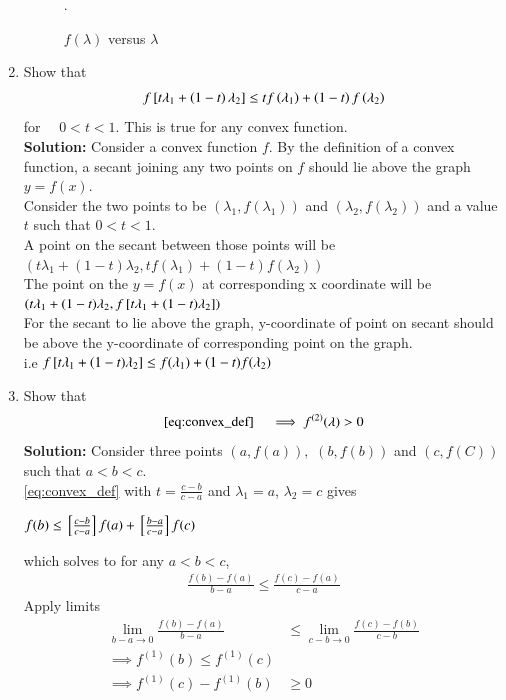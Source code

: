 \begin{enumerate}[label=\arabic*.,ref=\thesection.\theenumi]
\begin{figure}[!ht]
\caption{ $f(\lambda)$ versus $\lambda$}.
\label{fig:conv_def}	
\end{figure}
%
\item Show that
%
\begin{align}
\label{eq:convex_def}
f{}\left[t \lambda_1 + \left(1-t\right)\lambda_2\right] \leq 
t f\left(\lambda_1\right) + \left(1-t\right)f\left(\lambda_2\right)
\end{align}
%
for $\quad 0 < t < 1$.  This is true for any convex function.\\
%
\textbf{Solution: } Consider a convex function $f$. By the definition of a convex function, a secant joining any two points on $f$ should lie above the graph $y=f(x)$.\\
Consider the two points to be $(\lambda_1,f(\lambda_1))$ and $(\lambda_2,f(\lambda_2))$ and a value $t$ such that $0 < t < 1$.\\
A point on the secant between those points will be \\ 
$(t\lambda_1+(1-t)\lambda_2,t f(\lambda_1)+(1-t)f(\lambda_2))$ \\
The point on the $y=f(x)$ at corresponding x coordinate will be\\ 
$(t\lambda_1+(1-t)\lambda_2, f{}\left[t\lambda_1+(1-t)\lambda_2\right])$\\
For the secant to lie above the graph, y-coordinate of point on secant should be above the y-coordinate of corresponding point on the graph.\\
i.e $ f{}\left[t\lambda_1+(1-t)\lambda_2\right] \leq f(\lambda_1)+(1-t)f(\lambda_2)$

\item Show that 
%
\begin{equation}
\eqref{eq:convex_def} \quad \implies f^{(2)}(\lambda) > 0
\end{equation}
%
\textbf{Solution: }Consider three points $(a,f(a)),$ $(b,f(b))$ and $(c,f(C))$ such that $a<b<c$.\\
\eqref{eq:convex_def} with $t=\frac{c-b}{c-a}$ and $\lambda_1 =a$, $\lambda_2 =c$ gives
\begin{center}
    $f(b) \leq {}\left[\frac{c-b}{c-a}\right]f(a) + {}\left[\frac{b-a}{c-a}\right]f(c)$
\end{center}
%
which solves to for any $a<b<c$,
\begin{align}
    \frac{f(b)-f(a)}{b-a} \leq \frac{f(c)-f(a)}{c-a}
\end{align}
%
Apply limits
\begin{align*}
    \lim_{b-a\to 0}\frac{f(b)-f(a)}{b-a} &\leq \lim_{c-b\to 0}\frac{f(c)-f(b)}{c-b} \\
    \implies f^{(1)}(b) \leq f^{(1)}(c)\\
    \implies f^{(1)}(c) - f^{(1)}(b) &\geq 0 
\end{align*}  


\end{enumerate}

